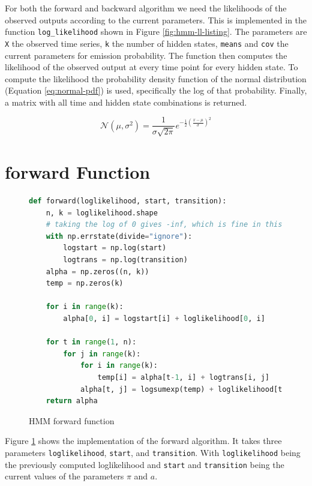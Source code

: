 For both the forward and backward algorithm we need the likelihoods of the observed outputs according to the current parameters. This is implemented in the function \texttt{log\_likelihood} shown in Figure \ref{fig:hmm-ll-listing}. The parameters are \texttt{X} the observed time series, \texttt{k} the number of hidden states, \texttt{means} and \texttt{cov} the current parameters for emission probability. The function then computes the likelihood of the observed output at every time point for every hidden state. To compute the likelihood the probability density function of the normal distribution (Equation \eqref{eq:normal-pdf}) is used, specifically the log of that probability. Finally, a matrix with all time and hidden state combinations is returned. 

\begin{equation}
  \mathcal{N}\left(\mu, \sigma^{2}\right) = \frac{1}{\sigma \sqrt{2 \pi}} e^{-\frac{1}{2}\left(\frac{x-\mu}{\sigma}\right)^{2}} 
  \label{eq:normal-pdf}
\end{equation}

\section{forward Function}

\begin{figure}
\begin{singlespace}
\begin{lstlisting}[language=Python]
def forward(loglikelihood, start, transition):
    n, k = loglikelihood.shape
    # taking the log of 0 gives -inf, which is fine in this case
    with np.errstate(divide="ignore"):
        logstart = np.log(start)
        logtrans = np.log(transition)
    alpha = np.zeros((n, k))
    temp = np.zeros(k)

    for i in range(k):
        alpha[0, i] = logstart[i] + loglikelihood[0, i]

    for t in range(1, n):
        for j in range(k):
            for i in range(k):
                temp[i] = alpha[t-1, i] + logtrans[i, j]
            alpha[t, j] = logsumexp(temp) + loglikelihood[t, j]
    return alpha
\end{lstlisting}
\end{singlespace}
   
\caption{HMM forward function}    
\label{fig:hmm-forward-listing}
\end{figure}

Figure \ref{fig:hmm-forward-listing} shows the implementation of the forward algorithm. It takes three parameters \texttt{loglikelihood}, \texttt{start}, and \texttt{transition}. With \texttt{loglikelihood} being the previously computed loglikelihood and \texttt{start} and \texttt{transition} being the current values of the parameters $\pi$  and $a$.

